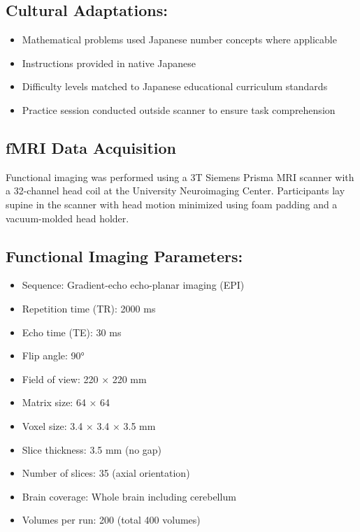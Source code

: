 \documentclass[12pt, a4paper]{article}
\begin{document}
\subsection*{Cultural Adaptations:}
\begin{itemize}
\item Mathematical problems used Japanese number concepts where applicable
\item Instructions provided in native Japanese
\item Difficulty levels matched to Japanese educational curriculum standards
\item Practice session conducted outside scanner to ensure task comprehension
\end{itemize}


\subsection{fMRI Data Acquisition}
Functional imaging was performed using a 3T Siemens Prisma MRI scanner with a 32-channel head coil at the University Neuroimaging Center. Participants lay supine in the scanner with head motion minimized using foam padding and a vacuum-molded head holder.


\subsection*{Functional Imaging Parameters:}
\begin{itemize}
\item Sequence: Gradient-echo echo-planar imaging (EPI)
\item Repetition time (TR): 2000 ms
\item Echo time (TE): 30 ms
\item Flip angle: 90°
\item Field of view: 220 × 220 mm
\item Matrix size: 64 × 64
\item Voxel size: 3.4 × 3.4 × 3.5 mm
\item Slice thickness: 3.5 mm (no gap)
\item Number of slices: 35 (axial orientation)
\item Brain coverage: Whole brain including cerebellum
\item Volumes per run: 200 (total 400 volumes)
\end{itemize}
\end{document}

